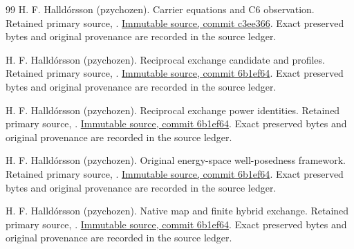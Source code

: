 \begin{thebibliography}{99}
 H. F. Halldórsson (pzychozen).
Carrier equations and C6 observation. Retained primary source, .
\href{https://github.com/pzychozen/trioctagon-physics/blob/c3ee366bd6195bd7fa77efd0321214af4c2dc173/papers/NATIVE_INTENSITY_AND_CONDITIONAL_CARRIER_CROSSINGS/publication/v0.1/manuscript/carrier.tex}{Immutable source, commit c3ee366}.
Exact preserved bytes and original provenance are recorded in the source ledger.

 H. F. Halldórsson (pzychozen).
Reciprocal exchange candidate and profiles. Retained primary source, .
\href{https://github.com/pzychozen/trioctagon-physics/blob/6b1ef6494a4d4c34398ba9d9e5a7afce1fb03f37/papers/NATIVE_CAPACITY_RECEIVING_RECOVERY/publication/v0.1/evidence/accepted_investigation/inputs/sources/P1/manuscript/candidate.tex}{Immutable source, commit 6b1ef64}.
Exact preserved bytes and original provenance are recorded in the source ledger.

 H. F. Halldórsson (pzychozen).
Reciprocal exchange power identities. Retained primary source, .
\href{https://github.com/pzychozen/trioctagon-physics/blob/6b1ef6494a4d4c34398ba9d9e5a7afce1fb03f37/papers/NATIVE_CAPACITY_RECEIVING_RECOVERY/publication/v0.1/evidence/accepted_investigation/inputs/sources/P1/manuscript/power.tex}{Immutable source, commit 6b1ef64}.
Exact preserved bytes and original provenance are recorded in the source ledger.

 H. F. Halldórsson (pzychozen).
Original energy-space well-posedness framework. Retained primary source, .
\href{https://github.com/pzychozen/trioctagon-physics/blob/6b1ef6494a4d4c34398ba9d9e5a7afce1fb03f37/papers/NATIVE_CAPACITY_RECEIVING_RECOVERY/publication/v0.1/evidence/accepted_investigation/inputs/sources/P1/manuscript/wellposed.tex}{Immutable source, commit 6b1ef64}.
Exact preserved bytes and original provenance are recorded in the source ledger.

 H. F. Halldórsson (pzychozen).
Native map and finite hybrid exchange. Retained primary source, .
\href{https://github.com/pzychozen/trioctagon-physics/blob/6b1ef6494a4d4c34398ba9d9e5a7afce1fb03f37/papers/NATIVE_CAPACITY_RECEIVING_RECOVERY/publication/v0.1/evidence/accepted_investigation/inputs/sources/P1/manuscript/hybrid.tex}{Immutable source, commit 6b1ef64}.
Exact preserved bytes and original provenance are recorded in the source ledger.
\end{thebibliography}

